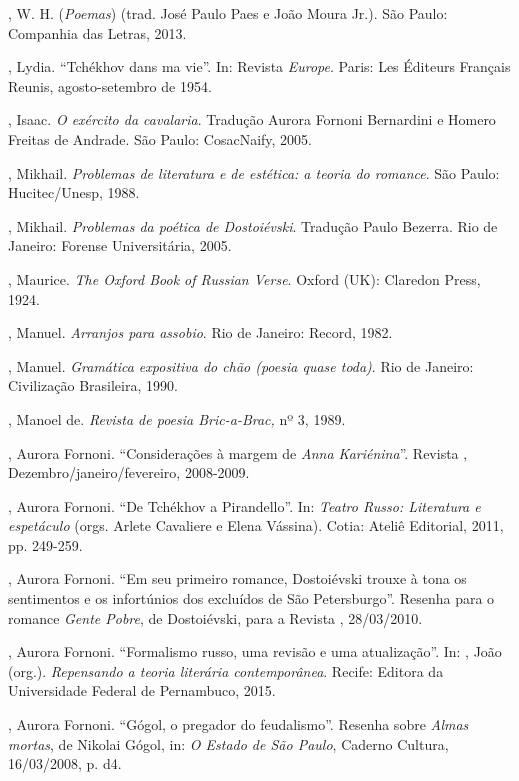 , W. H. \emph{} (\emph{Poemas}) (trad. José Paulo Paes e
João Moura Jr.). São Paulo: Companhia das Letras, 2013.

, Lydia. ``Tchékhov dans ma vie''. In: Revista \emph{Europe}.
Paris: Les Éditeurs Français Reunis, agosto-setembro de 1954.

, Isaac. \emph{O exército da cavalaria}. Tradução Aurora Fornoni Bernardini e Homero Freitas de
Andrade. São Paulo: CosacNaify, 2005.

, Mikhail. \emph{Problemas de literatura e de estética: a teoria do romance}. São Paulo: Hucitec/Unesp, 1988.

, Mikhail. \emph{Problemas da poética de Dostoiévski}. Tradução Paulo
Bezerra. Rio de Janeiro: Forense Universitária, 2005.

, Maurice. \emph{The Oxford Book of
Russian Verse}. Oxford (UK): Claredon Press, 1924. 

, Manuel. \emph{Arranjos para assobio}. Rio de Janeiro: Record, 1982.

, Manuel. \emph{Gramática expositiva do chão (poesia quase toda)}.
Rio de Janeiro: Civilização Brasileira, 1990.

, Manoel de. \emph{Revista de poesia Bric-a-Brac,} nº 3, 1989.

, Aurora Fornoni. ``Considerações à margem de \emph{Anna
Kariénina}''. Revista , Dezembro/janeiro/fevereiro, 2008-2009.

, Aurora Fornoni. ``De Tchékhov a Pirandello''. In:
\emph{Teatro Russo: Literatura e espetáculo} (orgs. Arlete Cavaliere e
Elena Vássina). Cotia: Ateliê Editorial, 2011, pp. 249-259.

, Aurora Fornoni. ``Em seu primeiro romance, Dostoiévski
trouxe à tona os sentimentos e os infortúnios dos excluídos de São
Petersburgo''. Resenha para o romance \emph{Gente Pobre}, de
Dostoiévski, para a Revista , 28/03/2010.

, Aurora Fornoni. ``Formalismo russo, uma revisão e uma
atualização''. In: , João (org.). \emph{Repensando a teoria
literária contemporânea}. Recife: Editora da Universidade Federal de
Pernambuco, 2015.

, Aurora Fornoni. ``Gógol, o pregador do feudalismo''. Resenha
sobre \emph{Almas mortas}, de Nikolai Gógol, in: \emph{O Estado de São Paulo}, Caderno
Cultura, 16/03/2008, p. d4.


